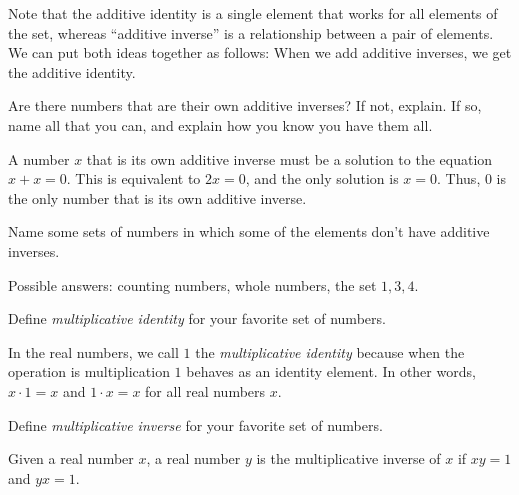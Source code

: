 \documentclass[space,handout,nooutcomes]{ximera}
\begin{document}
Note that the additive identity is a single element that works for
all elements of the set, whereas ``additive inverse'' is a
relationship between a pair of elements.  We can put both ideas
together as follows: When we add additive inverses, we get the
additive identity.

\begin{question}
Are there numbers that are their own additive inverses?  If not,
explain.  If so, name all that you can, and explain how you know you
have them all.
\begin{freeResponse}
\begin{hint}
A number $x$ that is its own additive inverse must be a solution to
the equation $x+x = 0$.  This is equivalent to $2x=0$, and the only
solution is $x=0$.  Thus, 0 is the only number that is its own
additive inverse.
\end{hint}
\end{freeResponse}
\end{question}

\begin{question}
Name some sets of numbers in which some of the elements don't have
additive inverses.
\begin{freeResponse}
\begin{hint}
Possible answers: counting numbers, whole numbers, the set ${1, 3,
  4}$.
\end{hint}
\end{freeResponse}
\end{question}

\begin{question}Define \emph{multiplicative identity} for your favorite set of numbers.  
\begin{freeResponse}
\begin{hint}
In the real numbers, we call $1$ the \emph{multiplicative identity} because when the operation is multiplication 
$1$ behaves as an identity element.  
In other words, $x\cdot 1=x$ and $1\cdot x=x$ for all real numbers $x$.  
\end{hint}
\end{freeResponse}
\end{question}

\begin{question}Define \emph{multiplicative inverse} for your favorite set of numbers.  
\begin{freeResponse}
\begin{hint}
Given a real number $x$, a real number $y$ is the multiplicative inverse of $x$ if $xy=1$ and $yx=1$.  
\end{hint}
\end{freeResponse}
\end{question}
\end{document}

